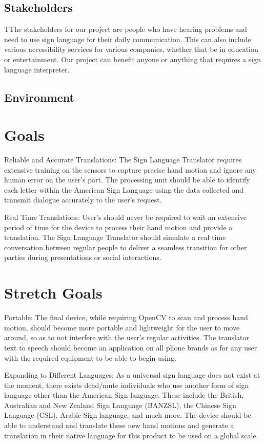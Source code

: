 \documentclass{article}
\begin{document}
\subsection{Stakeholders}
TThe stakeholders for our project are people who have hearing problems and need to use sign language for their daily communication. This can also include various accessibility services for various companies, whether that be in education or entertainment. Our project can benefit anyone or anything that requires a sign language interpreter.
\subsection{Environment}


\section{Goals}

Reliable and Accurate Translations:
The Sign Language Translator requires extensive training on the sensors to capture precise hand motion and ignore any human error on the user’s part. The processing unit should be able to identify each letter within the American Sign Language using the data collected and transmit dialogue accurately to the user’s request.

Real Time Translations:
User’s should never be required to wait an extensive period of time for the device to process their hand motion and provide a translation. The Sign Language Translator should simulate a real time conversation between regular people to deliver a seamless transition for other parties during presentations or social interactions.

\section{Stretch Goals}

Portable:
The final device, while requiring OpenCV to scan and process hand motion, should become more portable and lightweight for the user to move around, so as to not interfere with the user’s regular activities. The translator text to speech should become an application on all phone brands as for any user with the required equipment to be able to begin using.

Expanding to Different Languages:
As a universal sign language does not exist at the moment, there exists dead/mute individuals who use another form of sign language other than the American Sign language. These include the British, Australian and New Zealand Sign Language (BANZSL), the Chinese Sign Language (CSL), Arabic Sign language, and much more. The device should be able to understand and translate these new hand motions and generate a translation in their native language for this product to be used on a global scale.
\end{document}
